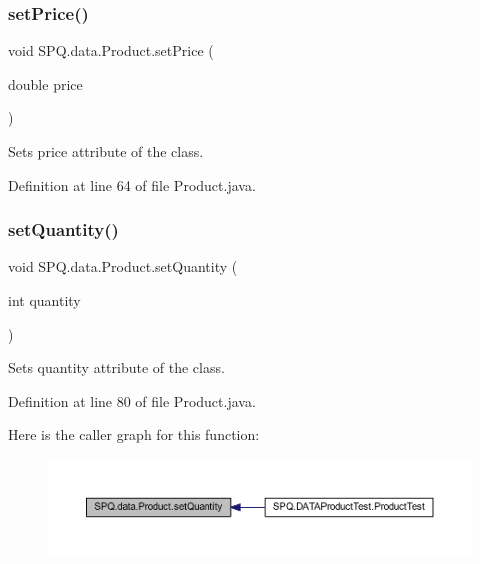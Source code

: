 \subsubsection{\texorpdfstring{set\+Price()}{setPrice()}\hspace{0.1cm}{\footnotesize\ttfamily [2/2]}}
{\footnotesize\ttfamily void S\+P\+Q.\+data.\+Product.\+set\+Price (\begin{DoxyParamCaption}\item[{double}]{price }\end{DoxyParamCaption})}

Sets price attribute of the class. 

Definition at line 64 of file Product.\+java.

\mbox{\label{class_s_p_q_1_1data_1_1_product_a057c7298cb6575a0d709f3fe2bf73ea7}} 
\subsubsection{\texorpdfstring{set\+Quantity()}{setQuantity()}}
{\footnotesize\ttfamily void S\+P\+Q.\+data.\+Product.\+set\+Quantity (\begin{DoxyParamCaption}\item[{int}]{quantity }\end{DoxyParamCaption})}

Sets quantity attribute of the class. 

Definition at line 80 of file Product.\+java.

Here is the caller graph for this function\+:\nopagebreak
\begin{figure}[H]
\begin{center}
\leavevmode
\includegraphics[width=350pt]{class_s_p_q_1_1data_1_1_product_a057c7298cb6575a0d709f3fe2bf73ea7_icgraph}
\end{center}
\end{figure}
\mbox{\label{class_s_p_q_1_1data_1_1_product_ab7714f5e5a6f1b0a293ad7140c351c3c}} 
